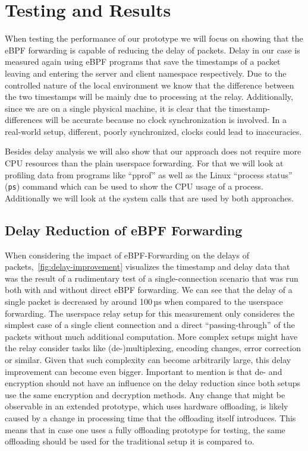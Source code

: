 \section{Testing and Results}\label{sec:testing_and_results}
When testing the performance of our prototype we will focus on showing that the eBPF forwarding
is capable of reducing the delay of packets.
Delay in our case is measured again using eBPF programs that save the timestamps of a packet 
leaving and entering the server and client namespace respectively.
Due to the controlled nature of the local environment we know that the difference 
between the two timestamps will be mainly due to processing at the relay.
Additionally, since we are on a single physical machine, it is clear that the timestamp-differences
will be accurate because no clock synchronization is involved.
In a real-world setup, different, poorly synchronized, clocks could lead to inaccuracies.

Besides delay analysis we will also show that our approach does not require more CPU resources
than the plain userspace forwarding.
For that we will look at profiling data from programs like ``pprof'' %
as well as the Linux ``process status'' (\verb|ps|) command which can be used to 
show the CPU usage of a process. %
Additionally we will look at the system calls that are used by both approaches.

\subsection{Delay Reduction of eBPF Forwarding}
When considering the impact of eBPF-Forwarding on the delays of packets,~\autoref{fig:delay-improvement}
visualizes the timestamp and delay data that was the result of a rudimentary test of a single-connection 
scenario that was run both with and without direct eBPF forwarding.
We can see that the delay of a single packet is decreased by around 100\,µs
when compared to the userspace forwarding. 
The userspace relay setup for this measurement only consideres the simplest case of a single client connection 
and a direct ``passing-through'' of the packets without much additional computation.
More complex setups might have the relay consider tasks like (de-)multiplexing, 
encoding changes, error correction or similar. 
Given that such complexity can become arbitrarily large, this delay improvement can become even bigger.
Important to mention is that de- and encryption should not have an influence on the delay 
reduction since both setups use the same encryption and decryption methods.
Any change that might be observable in an extended prototype, which uses hardware offloading,
is likely caused by a change in processing time that the offloading itself introduces.
This means that in case one uses a fully offloading prototype for testing, the same offloading
should be used for the traditional setup it is compared to.

